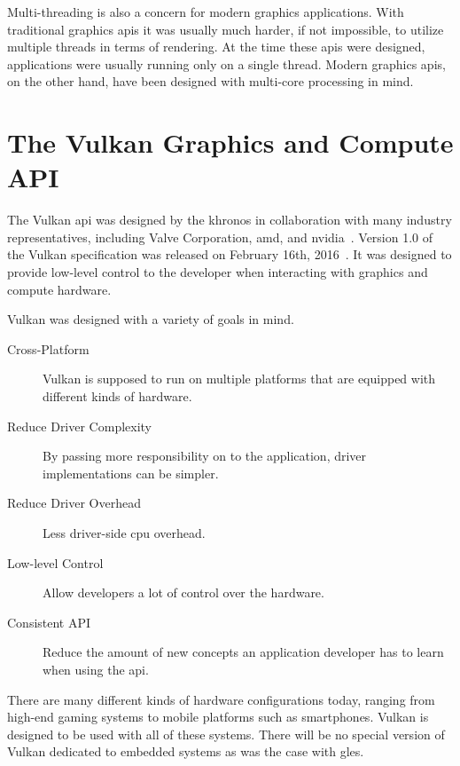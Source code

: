     Multi-threading is also a concern for modern graphics applications.
    With traditional graphics \glspl{api} it was usually much harder, if not impossible, to utilize multiple threads in terms of rendering.
    At the time these \glspl{api} were designed, applications were usually running only on a single thread.
    Modern graphics \glspl{api}, on the other hand, have been designed with multi-core processing in mind.




  \section{The Vulkan Graphics and Compute API}
    The Vulkan \gls{api} was designed by the \gls{khronos} in collaboration with many industry representatives, including Valve Corporation, \gls{amd}, and \gls{nvidia}~\cite{vkspec}.
    Version 1.0 of the Vulkan specification was released on February 16th, 2016~\cite{vkrelease1dot0}.
    It was designed to provide low-level control to the developer when interacting with graphics and compute hardware.

    Vulkan was designed with a variety of goals in mind.

    \begin{description}
      \item[Cross-Platform] Vulkan is supposed to run on multiple platforms that are equipped with different kinds of hardware.
      \item[Reduce Driver Complexity] By passing more responsibility on to the application, driver implementations can be simpler.
      \item[Reduce Driver Overhead] Less driver-side \gls{cpu} overhead.
      \item[Low-level Control] Allow developers a lot of control over the hardware.
      \item[Consistent API] Reduce the amount of new concepts an application developer has to learn when using the \gls{api}.
    \end{description}

    There are many different kinds of hardware configurations today, ranging from high-end gaming systems to mobile platforms such as smartphones.
    Vulkan is designed to be used with all of these systems.
    There will be no special version of Vulkan dedicated to embedded systems as was the case with \gls{gles}.

